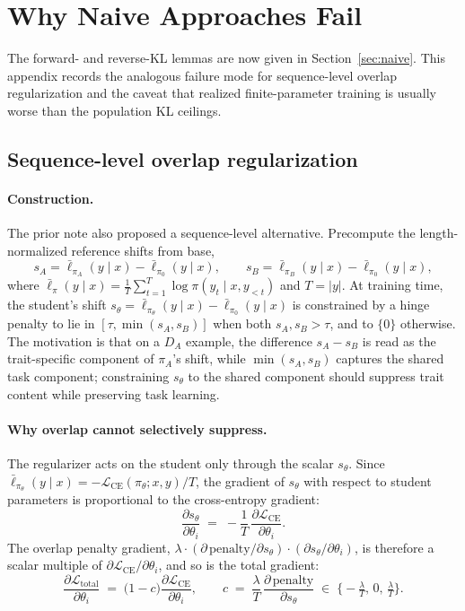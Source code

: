 \documentclass[11pt]{article}
\begin{document}
\newpage
\section{Why Naive Approaches Fail}
\label{app:fail}

The forward- and reverse-KL lemmas are now given in Section~\ref{sec:naive}. This appendix records the analogous failure mode for sequence-level overlap regularization and the caveat that realized finite-parameter training is usually worse than the population KL ceilings.

\subsection{Sequence-level overlap regularization}

\paragraph{Construction.} The prior note also proposed a sequence-level alternative. Precompute the length-normalized reference shifts from base,
\[
s_A = \bar\ell_{\pi_A}(y \mid x) - \bar\ell_{\pi_0}(y \mid x), \qquad s_B = \bar\ell_{\pi_B}(y \mid x) - \bar\ell_{\pi_0}(y \mid x),
\]
where $\bar\ell_\pi(y \mid x) = \tfrac{1}{T}\sum_{t=1}^T \log \pi(y_t \mid x, y_{<t})$ and $T = |y|$. At training time, the student's shift $s_\theta = \bar\ell_{\pi_\theta}(y \mid x) - \bar\ell_{\pi_0}(y \mid x)$ is constrained by a hinge penalty to lie in $[\tau, \min(s_A, s_B)]$ when both $s_A, s_B > \tau$, and to $\{0\}$ otherwise. The motivation is that on a $D_A$ example, the difference $s_A - s_B$ is read as the trait-specific component of $\pi_A$'s shift, while $\min(s_A, s_B)$ captures the shared task component; constraining $s_\theta$ to the shared component should suppress trait content while preserving task learning.

\paragraph{Why overlap cannot selectively suppress.} The regularizer acts on the student only through the scalar $s_\theta$. Since $\bar\ell_{\pi_\theta}(y \mid x) = -\mathcal{L}_{\mathrm{CE}}(\pi_\theta; x, y)/T$, the gradient of $s_\theta$ with respect to student parameters is proportional to the cross-entropy gradient:
\[
\frac{\partial s_\theta}{\partial \theta_i} \;=\; -\frac{1}{T}\, \frac{\partial \mathcal{L}_{\mathrm{CE}}}{\partial \theta_i}.
\]
The overlap penalty gradient, $\lambda \cdot (\partial\, \mathrm{penalty}/\partial s_\theta) \cdot (\partial s_\theta / \partial \theta_i)$, is therefore a scalar multiple of $\partial \mathcal{L}_{\mathrm{CE}}/\partial \theta_i$, and so is the total gradient:
\[
\frac{\partial \mathcal{L}_{\mathrm{total}}}{\partial \theta_i} \;=\; \bigl(1 - c\bigr) \frac{\partial \mathcal{L}_{\mathrm{CE}}}{\partial \theta_i}, \qquad c \;=\; \frac{\lambda}{T}\,\frac{\partial\, \mathrm{penalty}}{\partial s_\theta} \;\in\; \bigl\{-\tfrac{\lambda}{T},\, 0,\, \tfrac{\lambda}{T}\bigr\}.
\]
\end{document}
